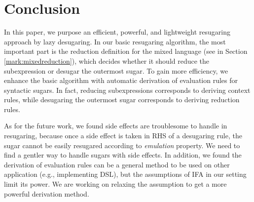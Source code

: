 \section{Conclusion}
\label{sec7}


In this paper, we purpose an efficient, powerful, and lightweight resugaring approach by lazy desugaring.
In our basic resugaring algorithm, the most important part is the reduction definition for the  mixed language (see in Section \ref{mark:mixedreduction}), which decides whether it should reduce the subexpression or desugar the outermost sugar.
To gain more efficiency, we enhance the basic algorithm with automatic derivation of  evaluation rules for syntactic sugars.
In fact, reducing subexpressions corresponds to  deriving context rules, while desugaring the outermost sugar corresponds to deriving reduction rules.


As for the future work, we found side effects are troublesome to handle in resugaring, because once a side effect is taken in RHS of a desugaring rule, the sugar cannot be easily resugared according to \emph{emulation} property. We need to find a gentler way to handle sugars with side effects. In addition, we found the derivation of evaluation rules can be a general method to be used on other application (e.g., implementing DSL), but the assumptions of IFA in our setting limit its power. We are working on relaxing the assumption to get a more powerful derivation method.

